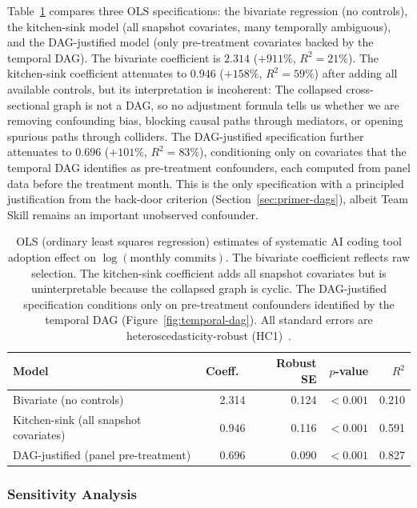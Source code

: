Table~\ref{tab:ols-comparison} compares three OLS specifications: the bivariate regression (no controls), the kitchen-sink model (all snapshot covariates, many temporally ambiguous), and the DAG-justified model (only pre-treatment covariates backed by the temporal DAG).
The bivariate coefficient is $2.314$ ($+911\%$, $R^2 = 21\%$).
The kitchen-sink coefficient attenuates to $0.946$ ($+158\%$, $R^2 = 59\%$) after adding all available controls, but its interpretation is incoherent: The collapsed cross-sectional graph is not a DAG, so no adjustment formula tells us whether we are removing confounding bias, blocking causal paths through mediators, or opening spurious paths through colliders.
The DAG-justified specification further attenuates to $0.696$ ($+101\%$, $R^2 = 83\%$), conditioning only on covariates that the temporal DAG identifies as pre-treatment confounders, each computed from panel data before the treatment month.
This is the only specification with a principled justification from the back-door criterion (Section~\ref{sec:primer-dags}), albeit Team Skill remains an important unobserved confounder.

\begin{table}[t]
\centering
\caption{OLS (ordinary least squares regression) estimates of systematic AI coding tool adoption effect on $\log(\text{monthly commits})$.
The bivariate coefficient reflects raw selection.
The kitchen-sink coefficient adds all snapshot covariates but is uninterpretable because the collapsed graph is cyclic.
The DAG-justified specification conditions only on pre-treatment confounders identified by the temporal DAG (Figure~\ref{fig:temporal-dag}).
All standard errors are heteroscedasticity-robust (HC1)~\cite{mackinnon1985heteroskedasticity}.}
\label{tab:ols-comparison}
\small
\begin{tabular}{lrrrr}
\toprule
Model & Coeff.\ & Robust SE & $p$-value & $R^2$ \\
\midrule
Bivariate (no controls) & 2.314 & 0.124 & ${<}0.001$ & 0.210 \\
Kitchen-sink (all snapshot covariates) & 0.946 & 0.116 & ${<}0.001$ & 0.591 \\
DAG-justified (panel pre-treatment) & 0.696 & 0.090 & ${<}0.001$ & 0.827 \\
\bottomrule
\end{tabular}
\end{table}

\subsubsection{Sensitivity Analysis}
\label{sec:cross-sectional-sensitivity}

